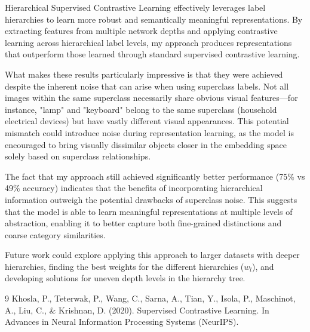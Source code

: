 \documentclass[10pt,a4paper]{article}
\begin{document}
Hierarchical Supervised Contrastive Learning effectively leverages label hierarchies to learn more robust and semantically meaningful representations. By extracting features from multiple network depths and applying contrastive learning across hierarchical label levels, my approach produces representations that outperform those learned through standard supervised contrastive learning.

What makes these results particularly impressive is that they were achieved despite the inherent noise that can arise when using superclass labels. Not all images within the same superclass necessarily share obvious visual features—for instance, "lamp" and "keyboard" belong to the same superclass (household electrical devices) but have vastly different visual appearances. This potential mismatch could introduce noise during representation learning, as the model is encouraged to bring visually dissimilar objects closer in the embedding space solely based on superclass relationships. 

The fact that my approach still achieved significantly better performance (75\% vs 49\% accuracy) indicates that the benefits of incorporating hierarchical information outweigh the potential drawbacks of superclass noise. This suggests that the model is able to learn meaningful representations at multiple levels of abstraction, enabling it to better capture both fine-grained distinctions and coarse category similarities.

Future work could explore applying this approach to larger datasets with deeper hierarchies, finding the best weights for the different hierarchies ($w_l$), and developing solutions for uneven depth levels in the hierarchy tree.

\begin{thebibliography}{9}
Khosla, P., Teterwak, P., Wang, C., Sarna, A., Tian, Y., Isola, P., Maschinot, A., Liu, C., \& Krishnan, D. (2020). Supervised Contrastive Learning. In Advances in Neural Information Processing Systems (NeurIPS).
\end{thebibliography}
\end{document}
